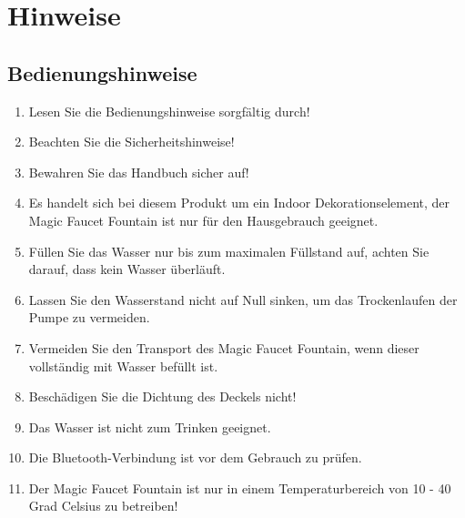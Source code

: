 %
%
%


\chapter{Hinweise}
\section{Bedienungshinweise}
\begin{enumerate}
	\item Lesen Sie die Bedienungshinweise sorgfältig durch!
	\item Beachten Sie die Sicherheitshinweise! 
	\item Bewahren Sie das Handbuch sicher auf!
	\item Es handelt sich bei diesem Produkt um ein Indoor Dekorationselement, der Magic Faucet Fountain ist nur für den Hausgebrauch geeignet. 
	\item Füllen Sie das Wasser nur bis zum maximalen Füllstand auf, achten Sie darauf, dass kein Wasser überläuft.
	\item Lassen Sie den Wasserstand nicht auf Null sinken, um das Trockenlaufen der Pumpe zu vermeiden.
	\item Vermeiden Sie den Transport des Magic Faucet Fountain, wenn dieser vollständig mit Wasser befüllt ist.
	\item Beschädigen Sie die Dichtung des Deckels nicht!
	\item Das Wasser ist nicht zum Trinken geeignet.
	\item Die Bluetooth-Verbindung ist vor dem Gebrauch zu prüfen.
	\item Der Magic Faucet Fountain ist nur in einem Temperaturbereich von 10 - 40 Grad Celsius zu betreiben!
\end{enumerate}
\newpage

